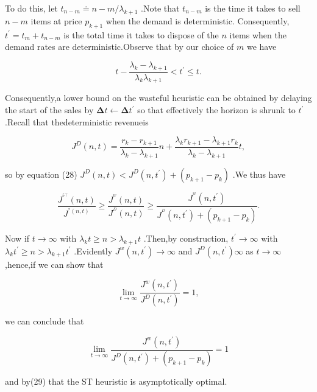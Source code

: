 To do this, let \(t _ { n - m } \doteq n - m / \lambda _ { k + 1 }\)
.Note that \(t _ { n - m }\) is the time it takes to sell \(n - m\)
items at price \(p _ { k + 1 }\) when the demand is deterministic.
Consequently, \(t ^ { \prime } = t _ { m } + t _ { n - m }\) is the
total time it takes to dispose of the \(n\) items when the demand rates
are deterministic.Observe that by our choice of \(m\) we have

\[
t - \frac { \lambda _ { k } - \lambda _ { k + 1 } } { \lambda _ { k } \lambda _ { k + 1 } } < t ^ { \prime } \leq t .
\]

Consequently,a lower bound on the wasteful heuristic can be obtained by
delaying the start of the sales by
\(\mathbf { \Delta } t \gets \mathbf { \Delta } t ^ { \prime }\) so that
effectively the horizon is shrunk to \(t ^ { \prime }\) .Recall that
thedeterministic revenueis

\[
J ^ { D } ( n , t ) = \frac { r _ { k } - r _ { k + 1 } } { \lambda _ { k } - \lambda _ { k + 1 } } n + \frac { \lambda _ { k } r _ { k + 1 } - \lambda _ { k + 1 } r _ { k } } { \lambda _ { k } - \lambda _ { k + 1 } } t ,
\]

so by equation (28)
\(J ^ { D } ( n , t ) < J ^ { D } ( n , t ^ { \prime } ) + ( p _ { k + 1 } - p _ { k } )\)
.We thus have

\[
\frac { J ^ { ^ { 5 \top } } ( n , t ) } { J ^ { ^ { * } ( n , t ) } } \geq \frac { J ^ { ^ { w } } ( n , t ) } { J ^ { ^ { D } } ( n , t ) } \geq \frac { J ^ { ^ { w } } ( n , t ^ { \prime } ) } { J ^ { ^ { D } } ( n , t ^ { \prime } ) + ( p _ { k + 1 } - p _ { k } ) } .
\]

Now if \(t \to \infty\) with
\(\lambda _ { k } t \geq n > \lambda _ { k + 1 } t\) .Then,by
construction, \(t ^ { \prime } \to \infty\) with
\(\lambda _ { k } t ^ { \prime } \geq n > \lambda _ { k + 1 } t ^ { \prime }\)
.Evidently \(J ^ { w } ( n , t ^ { \prime } ) \to \infty\) and
\(J ^ { D } ( n , t ^ { \prime } )  \infty\) as \(t \to \infty\)
,hence,if we can show that

\[
\operatorname* { l i m } _ { t \to \infty } \frac { J ^ { w } ( n , t ^ { \prime } ) } { J ^ { D } ( n , t ^ { \prime } ) } = 1 ,
\]

we can conclude that

\[
\operatorname* { l i m } _ { t \to \infty } \frac { J ^ { w } ( n , t ^ { \prime } ) } { J ^ { D } ( n , t ^ { \prime } ) + ( p _ { k + 1 } - p _ { k } ) } = 1
\]

and by(29) that the ST heuristic is asymptotically optimal.

